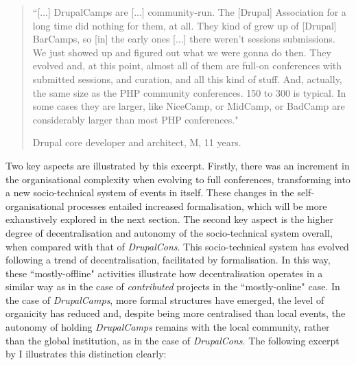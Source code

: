 \begin{quotation}
``[...] DrupalCamps are [...] community-run. The [Drupal] Association for a long time did nothing for them, at all. They kind of grew up of [Drupal] BarCamps, so [in] the early ones [...] there weren't sessions submissions. We just showed up and figured out what we were gonna do then. They evolved and, at this point, almost all of them are full-on conferences with submitted sessions, and curation, and all this kind of stuff. And, actually, the same size as the PHP community conferences. 150 to 300 is typical. In some cases they are larger, like NiceCamp, or MidCamp, or BadCamp are considerably larger than most PHP conferences."

\begin{flushright}\footnotesize{Drupal core developer and architect, M, 11 years.}\end{flushright}
\end{quotation}

Two key aspects are illustrated by this excerpt. Firstly, there was an increment in the organisational complexity when evolving to full conferences, transforming into a new socio-technical system of events in itself. These changes in the self-organisational processes entailed increased formalisation, which will be more exhaustively explored in the next section. The second key aspect is the higher degree of decentralisation and autonomy of the socio-technical system overall, when compared with that of \textit{DrupalCons}.
This socio-technical system has evolved following a trend of decentralisation, facilitated by formalisation. In this way, these ``mostly-offline" activities illustrate how decentralisation operates in a similar way as in the case of \textit{contributed} projects in the ``mostly-online" case. In the case of \textit{DrupalCamps}, more formal structures have emerged, the level of organicity has reduced and, despite being more centralised than local events, the autonomy of holding \textit{DrupalCamps} remains with the local community, rather than the global institution, as in the case of \textit{DrupalCons}. The following excerpt by I illustrates this distinction clearly:

